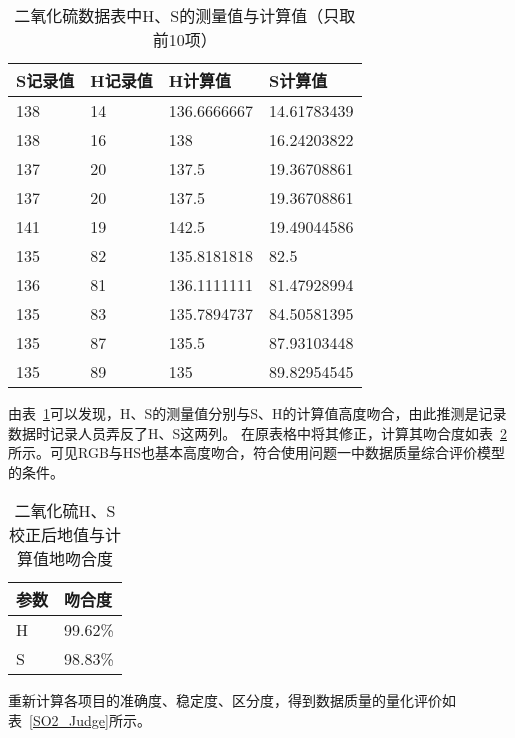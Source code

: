 \begin{table}[]
    \centering
    \caption{二氧化硫数据表中H、S的测量值与计算值（只取前10项）}
    \label{SO2_HSCheck}
    \begin{tabular}{@{}llll@{}}
    \toprule
    S记录值 & H记录值 & H计算值        & S计算值        \\ \midrule
    138  & 14   & 136.6666667 & 14.61783439 \\
    138  & 16   & 138         & 16.24203822 \\
    137  & 20   & 137.5       & 19.36708861 \\
    137  & 20   & 137.5       & 19.36708861 \\
    141  & 19   & 142.5       & 19.49044586 \\
    135  & 82   & 135.8181818 & 82.5        \\
    136  & 81   & 136.1111111 & 81.47928994 \\
    135  & 83   & 135.7894737 & 84.50581395 \\
    135  & 87   & 135.5       & 87.93103448 \\
    135  & 89   & 135         & 89.82954545 \\ \bottomrule
    \end{tabular}
    \end{table}

由表~\ref{SO2_HSCheck}可以发现，H、S的测量值分别与S、H的计算值高度吻合，由此推测是记录数据时记录人员弄反了H、S这两列。
在原表格中将其修正，计算其吻合度如表~\ref{SO2_HSMatch}所示。可见RGB与HS也基本高度吻合，符合使用问题一中数据质量综合评价模型的条件。

\begin{table}[]
    \centering
    \caption{二氧化硫H、S校正后地值与计算值地吻合度}
    \label{SO2_HSMatch}
    \begin{tabular}{@{}ll@{}}
    \toprule
    参数 & 吻合度     \\ \midrule
    H  & 99.62\% \\
    S  & 98.83\% \\ \bottomrule
    \end{tabular}
    \end{table}

重新计算各项目的准确度、稳定度、区分度，得到数据质量的量化评价如表~\ref{SO2_Judge}所示。

